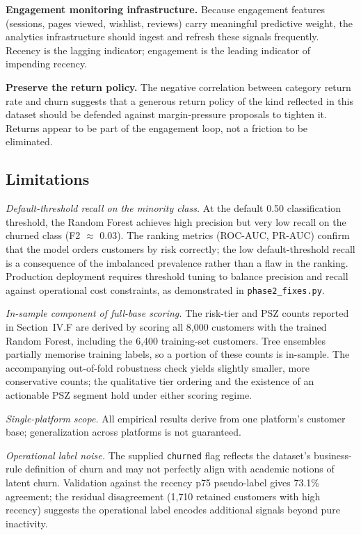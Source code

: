 \documentclass[conference]{IEEEtran}
\begin{document}
\textbf{Engagement monitoring infrastructure.} Because engagement features (sessions, pages viewed, wishlist, reviews) carry meaningful predictive weight, the analytics infrastructure should ingest and refresh these signals frequently. Recency is the lagging indicator; engagement is the leading indicator of impending recency.

\textbf{Preserve the return policy.} The negative correlation between category return rate and churn suggests that a generous return policy of the kind reflected in this dataset should be defended against margin-pressure proposals to tighten it. Returns appear to be part of the engagement loop, not a friction to be eliminated.

\subsection{Limitations}

\emph{Default-threshold recall on the minority class.} At the default 0.50 classification threshold, the Random Forest achieves high precision but very low recall on the churned class (F2 $\approx$ 0.03). The ranking metrics (ROC-AUC, PR-AUC) confirm that the model orders customers by risk correctly; the low default-threshold recall is a consequence of the imbalanced prevalence rather than a flaw in the ranking. Production deployment requires threshold tuning to balance precision and recall against operational cost constraints, as demonstrated in \texttt{phase2\_fixes.py}.

\emph{In-sample component of full-base scoring.} The risk-tier and PSZ counts reported in Section~IV.F are derived by scoring all 8{,}000 customers with the trained Random Forest, including the 6{,}400 training-set customers. Tree ensembles partially memorise training labels, so a portion of these counts is in-sample. The accompanying out-of-fold robustness check yields slightly smaller, more conservative counts; the qualitative tier ordering and the existence of an actionable PSZ segment hold under either scoring regime.

\emph{Single-platform scope.} All empirical results derive from one platform's customer base; generalization across platforms is not guaranteed.

\emph{Operational label noise.} The supplied \texttt{churned} flag reflects the dataset's business-rule definition of churn and may not perfectly align with academic notions of latent churn. Validation against the recency p75 pseudo-label gives 73.1\% agreement; the residual disagreement (1{,}710 retained customers with high recency) suggests the operational label encodes additional signals beyond pure inactivity.
\end{document}

